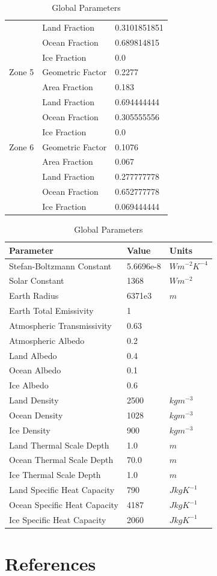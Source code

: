 \documentclass{article}
\begin{document}
\begin{appendices}
\begin{table}[H]
{\begin{tabular}{lll}
     & Land Fraction & 0.3101851851 \\
     & Ocean Fraction & 0.689814815 \\ 
     & Ice Fraction & 0.0\\
    \hline
    Zone 5 & Geometric Factor & 0.2277 \\
     & Area Fraction & 0.183 \\
     & Land Fraction & 0.694444444 \\
     & Ocean Fraction & 0.305555556 \\ 
     & Ice Fraction & 0.0\\
    \hline
    Zone 6 & Geometric Factor & 0.1076 \\
     & Area Fraction & 0.067 \\
     & Land Fraction & 0.277777778 \\
     & Ocean Fraction & 0.652777778 \\ 
     & Ice Fraction & 0.069444444\\
    \end{tabular}
    \label{tab:zoneparams}
    }
    \hfill
    \parbox{.45\linewidth}{
    \captionsetup{singlelinecheck = false, justification=justified}
    \caption{Global Parameters}
    \begin{tabular}{lll}
    \hline
    Parameter & Value & Units \\
    \hline
    Stefan-Boltzmann Constant & 5.6696e-8 & $Wm^{-2}K^{-4}$ \\
    Solar Constant & 1368 & $Wm^{-2}$ \\
    Earth Radius & 6371e3 & $m$ \\
    Earth Total Emissivity & 1  \\
    Atmospheric Transmissivity & 0.63  \\
    Atmospheric Albedo & 0.2 \\
    Land Albedo & 0.4 \\
    Ocean Albedo & 0.1\\
    Ice Albedo & 0.6 \\
    Land Density & 2500 & $kgm^{-3}$\\
    Ocean Density & 1028 & $kgm^{-3}$\\
    Ice Density & 900 & $kgm^{-3}$\\
    Land Thermal Scale Depth & 1.0 & $m$ \\
    Ocean Thermal Scale Depth & 70.0 & $m$ \\
    Ice Thermal Scale Depth & 1.0 & $m$ \\
    Land Specific Heat Capacity & 790 & $JkgK^{-1}$\\
    Ocean Specific Heat Capacity & 4187 & $JkgK^{-1}$\\
    Ice Specific Heat Capacity & 2060 & $JkgK^{-1}$\\
    \end{tabular}
    \label{tab:globalparams}}
\end{table}
\FloatBarrier


\newpage
\section{References}
\printbibliography

\end{appendices}
\end{document}
